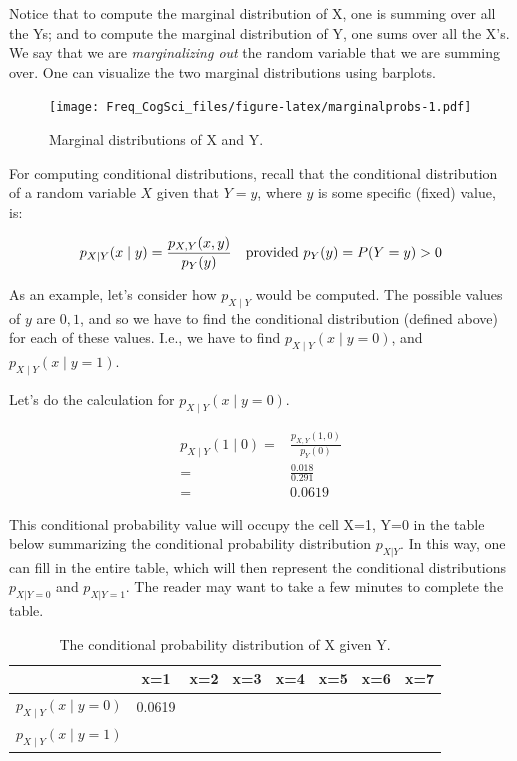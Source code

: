 \documentclass[12pt,]{krantz}
\begin{document}
Notice that to compute the marginal distribution of X, one is summing over all the Ys; and to compute the marginal distribution of Y, one sums over all the X's. We say that we are \emph{marginalizing out} the random variable that we are summing over. One can visualize the two marginal distributions using barplots.

\begin{figure}
\centering
\texttt{[image: Freq\_CogSci\_files/figure-latex/marginalprobs-1.pdf]}
\caption{\label{fig:marginalprobs}Marginal distributions of X and Y.}
\end{figure}

For computing conditional distributions, recall that the conditional distribution of a random variable \(X\) given that \(Y=y\), where \(y\) is some specific (fixed) value, is:

\begin{equation}
p_{X\mid Y} (x\mid y) = \frac{p_{X,Y}(x,y)}{p_Y(y)}	\quad \hbox{provided } p_Y(y)=P(Y=y)>0
\end{equation}

As an example, let's consider how \(p_{X\mid Y}\) would be computed.
The possible values of \(y\) are \(0,1\), and so we have to find the conditional distribution (defined above) for each of these values. I.e., we have to find \(p_{X\mid Y}(x\mid y=0)\), and \(p_{X\mid Y}(x\mid y=1)\).

Let's do the calculation for \(p_{X\mid Y}(x\mid y=0)\).

\begin{equation}
\begin{split}
p_{X\mid Y} (1\mid 0) =& \frac{p_{X,Y}(1,0)}{p_Y(0)}\\
	=&  \frac{0.018}{0.291}\\
	=& 0.0619
\end{split}	
\end{equation}

This conditional probability value will occupy the cell X=1, Y=0 in the table below summarizing the conditional probability distribution \(p_{X|Y}\). In this way, one can fill in the entire table, which will then represent the conditional distributions \(p_{X|Y=0}\) and \(p_{X|Y=1}\). The reader may want to take a few minutes to complete the table.

\begin{table}[!htbp]
\begin{center}
\begin{tabular}{c|ccccccc}
	& x=1 & x=2 & x=3 & x=4 & x=5 & x=6 & x=7\\ 
\hline	
$p_{X\mid Y}(x\mid y=0)$  & 0.0619 &  & & & & & \\
$p_{X\mid Y}(x\mid y=1)$  &  &  & & & & &  \\
\end{tabular}
\end{center}
\caption{The conditional probability distribution of X given Y.}
\label{XgivenY}
\end{table}
\end{document}
